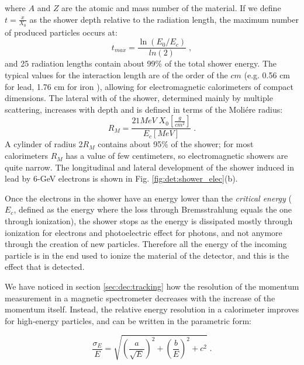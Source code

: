 where $A$ and $Z$ are the atomic and mass number of the material. If we define $t = \frac{x}{X_0}$ as the shower depth relative to the radiation length, the maximum number of produced particles occurs at:
\begin{equation}
t_{max} = \frac{\ln \left(E_0/E_c\right)}{ln\left(2\right)} \;,
\end{equation}
and 25 radiation lengths contain about 99\% of the total shower energy. The typical values for the interaction length are of the order of the $cm$ (e.g. 0.56 cm for lead, 1.76 cm for iron \cite{Patrignani:2016xqp}), allowing for electromagnetic calorimeters of compact dimensions. 
The lateral with of the shower, determined mainly by multiple scattering, increases with depth and is defined in terms of the Moli\'ere radius:
\begin{equation}
R_M = \frac{21 MeV \; X_0[\frac{g}{cm^2}]}{E_c [MeV]} \; .
\end{equation}
A cylinder of radius 2$R_M$ contains about 95\% of the shower; for most calorimeters $R_M$ has a value of few centimeters, so electromagnetic showers are quite narrow. The longitudinal and lateral development of the shower induced in lead by 6-GeV electrons is shown in Fig. \ref{fig:det:shower_elec}(b).

Once the electrons in the shower have an energy lower than the \textit{critical energy} ($E_c$, defined as the energy where the loss through Bremsstrahlung equals the one through ionization), the shower stops as the energy is dissipated mostly through ionization for electrons and photoelectric effect for photons, and not anymore through the creation of new particles. Therefore all the energy of the incoming particle is in the end used to ionize the material of the detector, and this is the effect that is detected.


We have noticed in section \ref{sec:dec:tracking} how the resolution of the momentum measurement in a magnetic spectrometer decreases with the increase of the momentum itself. Instead, the relative energy resolution in a calorimeter improves for high-energy particles, and can be written in the parametric form:

\begin{equation}
\frac{\sigma_E}{E} = \sqrt{\left(\frac{a}{\sqrt{E}} \right)^2 + \left( \frac{b}{E} \right)^2 + c^2 } \; .
\end{equation}

